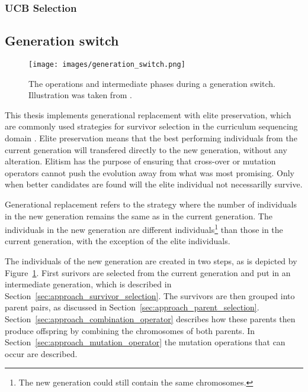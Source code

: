 \subsubsection{UCB Selection}
\label{sec:approach_ucb}

\subsection{Generation switch}
\label{sec:approach_generation_switch}
\begin{figure}[ht!]
	\centering
	\texttt{[image: images/generation\_switch.png]}
	\caption[Generation switch]{The operations and intermediate phases during a generation switch. Illustration was taken from \cite{Whitley1994}.}
	\label{fig:generation_switch}
\end{figure}
This thesis implements generational replacement with elite preservation, which
are commonly used strategies for survivor selection in the curriculum
sequencing domain \cite{AlMuhaideb2011}.
Elite preservation means that the best performing individuals from the current
generation will transfered directly to the new generation, without any
alteration. Elitism has the purpose of ensuring that cross-over or mutation
operators cannot push the evolution away from what was most promising.
Only when better candidates are found will the elite individual not necessarilly survive.

Generational replacement refers to the strategy where the number of individuals
in the new generation remains the same as in the current generation. The
individuals in the new generation are different individuals\footnote{The new
generation  could still contain the same chromosomes.} than those in the
current generation, with the exception of the elite individuals.

The individuals of the new generation are created in two steps, as is depicted
by Figure~\ref{fig:generation_switch}. First surivors are selected from the
current generation and put in an intermediate generation, which is described in
Section~\ref{sec:approach_survivor_selection}. The survivors are then grouped
into parent pairs, as discussed in
Section~\ref{sec:approach_parent_selection}.
Section~\ref{sec:approach_combination_operator} describes how these parents
then produce offspring by combining the chromosomes of both parents. In
Section~\ref{sec:approach_mutation_operator} the mutation operations that
can occur are described.

